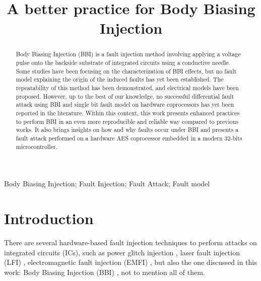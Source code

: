 \documentclass[10pt, conference, compsocconf]{IEEEtran}
\begin{document}
\title{A better practice for Body Biasing Injection}
\author{
        }

\maketitle

\begin{abstract}
Body Biasing Injection (BBI) is a fault injection method involving applying a voltage pulse onto the backside substrate of integrated circuits using a conductive needle.
Some studies have been focusing on the characterization of BBI effects, but no fault model explaining the origin of the induced faults has yet been established.
The repeatability of this method has been demonstrated, and electrical models have been proposed. However, up to the best of our knowledge, no successful differential fault attack using BBI and single bit fault model on hardware coprocessors has yet been reported in the literature.
Within this context, this work presents enhanced practices to perform BBI in an even more reproducible and reliable way compared to previous works.
It also brings insights on how and why faults occur under BBI and presents a fault attack performed on a hardware AES coprocessor embedded in a modern 32-bits microcontroller.

\end{abstract}

\begin{IEEEkeywords}
Body Biasing Injection; Fault Injection; Fault Attack; Fault model
\end{IEEEkeywords}
\IEEEpeerreviewmaketitle

\section{Introduction}
\label{section:intro}
There are several hardware-based fault injection techniques to perform attacks on integrated circuits (ICs), such as power glitch injection \cite{powerGlitch}, laser fault injection (LFI) \cite{optical, phototriple, lfitriplewell}, electromagnetic fault injection (EMFI) \cite{mathieuEMFI, techEM}, but also the one discussed in this work: Body Biasing Injection (BBI) \cite{pmaurine2012, japBBI, oflynn2020, nbb2016, ktobich2013}, not to mention all of them.
\end{document}
